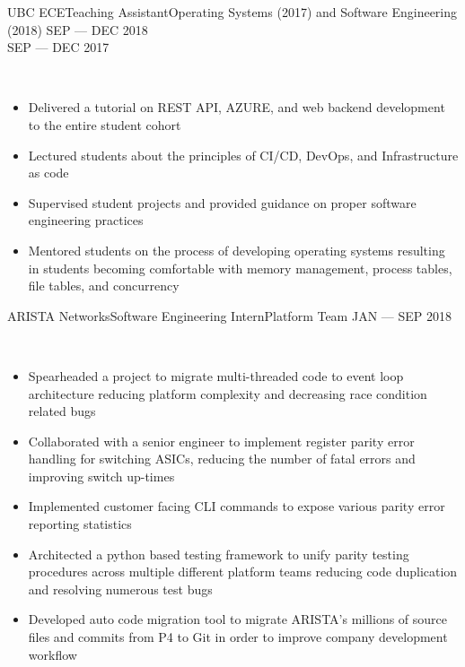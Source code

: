 
\begin{experiences}
    {UBC ECE}{Teaching Assistant}{Operating Systems (2017) and Software Engineering (2018)}
    {SEP --- DEC 2018 \\ SEP --- DEC 2017}{\
      \begin{itemize}
        \item Delivered a tutorial on REST API, AZURE, and web backend development to the entire
              student cohort
        \item Lectured students about the principles of CI/CD, DevOps, and Infrastructure as code
        \item Supervised student projects and provided guidance on proper software engineering
              practices
        \item Mentored students on the process of developing operating systems resulting in students
              becoming comfortable with memory management, process tables, file tables, and
              concurrency
      \end{itemize}
    }

  \emptySeparator

    {ARISTA Networks}{Software Engineering Intern}{Platform Team}
    {JAN --- SEP 2018}{\
      \begin{itemize}
        \item Spearheaded a project to migrate multi-threaded code to event loop architecture
              reducing platform complexity and decreasing race condition related bugs
        \item Collaborated with a senior engineer to implement register parity error handling for
              switching ASICs, reducing the number of fatal errors and improving switch up-times
        \item Implemented customer facing CLI commands to expose various parity error reporting
              statistics
        \item Architected a python based testing framework to unify parity testing procedures
              across multiple different platform teams reducing code duplication and resolving
              numerous test bugs
        \item Developed auto code migration tool to migrate ARISTA's millions of source files and
              commits from P4 to Git in order to improve company development workflow
      \end{itemize}
    }


\end{experiences}
